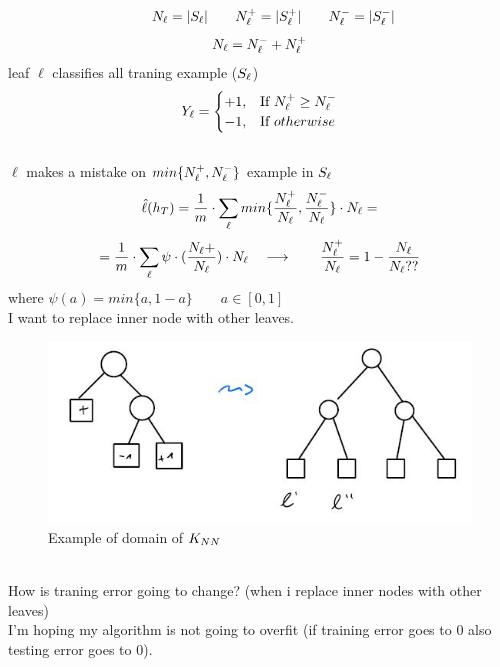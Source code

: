 \documentclass[../main.tex]{subfiles}
\begin{document}
$$
\qquad N_{\ell} = | S_{\ell}| 
\qquad N_{\ell}^+ = |S_{\ell}^+| 
\qquad  N_{\ell}^- = |S_{\ell}^-| $$
$$
N_{\ell} = N_{\ell}^- + N_{\ell}^+
$$
leaf $\ell$ classifies all traning example ($S_{\ell}$)
\\
$$
Y_{\ell} = 
\begin{cases}
+1, & \mbox{If } N_{\ell}^+ \geq N_{\ell}^- 
\\
-1, & \mbox{If } otherwise
\end{cases}
$$
\\
$\ell$ makes a mistake on $min \{N_{\ell}^+, N_{\ell}^- \}$ example in $S_{\ell}$
$$
\hat{\ell}(h_T) = \frac{1}{m} 
\cdot \sum_{\ell}{} min \{ \frac{N_{\ell}^+}{N_{\ell}} , \frac{N_{\ell}^-}{N_{\ell}} \} \cdot N_{\ell} =
$$
$$
= \frac{1}{m} \cdot \sum_{\ell}{}\psi \cdot (\frac{N_{\ell}+}{N_{\ell}}) \cdot N_{\ell} \quad \longrightarrow  \qquad \frac{N_{\ell}^+}{N_{\ell}} = 1 - \frac{N_{\ell}}{N_{\ell} ??}
$$
where $\psi(a) = min \{a, 1-a \} \qquad a \in [0,1] $
\\
I want to replace inner node with other leaves.
\\
\begin{figure}[h]
    \centering
    \includegraphics[width=0.8\linewidth]{../img/lez5-img2.JPG}
    \caption{Example of domain of $K_{NN}$}
\end{figure}
\\
How is traning error going to change?
(when i replace inner nodes with other leaves)
\\
I’m hoping my algorithm is not going to overfit (if training error goes to 0 also
testing error goes to 0).
\newpage
\end{document}
